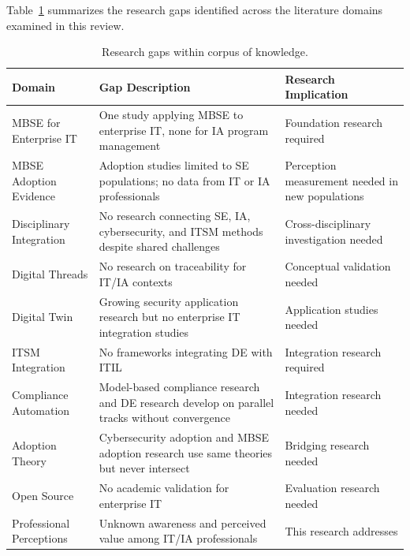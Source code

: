 Table~\ref{tab:researchGaps} summarizes the research gaps identified across the literature domains examined in this review.

\begin{table}[htbp]
  \centering
  \caption{Research gaps within corpus of knowledge.}\label{tab:researchGaps}
  \small
  \begin{tabular}{@{}p{1.8in}p{2.1in}p{2.2in}@{}}
    \toprule
    \textbf{Domain} & \textbf{Gap Description} & \textbf{Research Implication} \\
    \midrule
    MBSE for Enterprise IT & One study applying MBSE to enterprise IT, none for IA program management & Foundation research required \\
    MBSE Adoption Evidence & Adoption studies limited to SE populations; no data from IT or IA professionals & Perception measurement needed in new populations \\
    Disciplinary Integration & No research connecting SE, IA, cybersecurity, and ITSM methods despite shared challenges & Cross-disciplinary investigation needed \\
    Digital Threads & No research on traceability for IT/IA contexts & Conceptual validation needed \\
    Digital Twin & Growing security application research but no enterprise IT integration studies & Application studies needed \\
    ITSM Integration & No frameworks integrating DE with ITIL & Integration research required \\
    Compliance Automation & Model-based compliance research and DE research develop on parallel tracks without convergence & Integration research needed \\
    Adoption Theory & Cybersecurity adoption and MBSE adoption research use same theories but never intersect & Bridging research needed \\
    Open Source & No academic validation for enterprise IT & Evaluation research needed \\
    Professional Perceptions & Unknown awareness and perceived value among IT/IA professionals & This research addresses \\
    \bottomrule
  \end{tabular}
\end{table}


